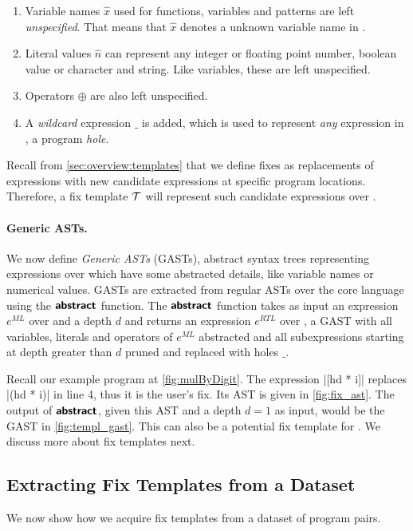 \begin{enumerate}
    \item Variable names $\hat{x}$ used for functions, variables and patterns
    are left \emph{unspecified}. That means that $\hat{x}$ denotes a unknown
    variable name in \repairLang.
    \item Literal values $\hat{n}$ can represent any integer or floating point
    number, boolean value or character and string. Like variables, these are
    left unspecified.
    \item Operators $\oplus$ are also left unspecified.
    \item A \emph{wildcard} expression $\_$ is added, which is used to represent
    \emph{any} expression in \repairLang, \ie a program \emph{hole}.
\end{enumerate}

Recall from \autoref{sec:overview:templates} that we define fixes as
replacements of expressions with new candidate expressions at specific program
locations. Therefore, a fix template $\mathcal{T}$ will represent such candidate
expressions over \repairLang.

\paragraph{Generic ASTs.}
We now define \emph{Generic ASTs} (GASTs), \ie abstract syntax trees
representing expressions over \repairLang which have some abstracted details,
like variable names or numerical values. GASTs are extracted from regular ASTs
over the core language \lang using the $\bm{\mathsf{abstract}}$ function. The $\bm{\mathsf{abstract}}$
function takes as input an expression $e^{ML}$ over \lang and a depth $d$ and
returns an expression $e^{RTL}$ over \repairLang, \ie a GAST with all variables,
literals and operators of $e^{ML}$ abstracted and all subexpressions starting at
depth greater than $d$ pruned and replaced with holes $\_$.


Recall our example program \mbd at \autoref{fig:mulByDigit}. The expression
|[hd * i]| replaces |(hd * i)| in line 4, thus it is the user's fix. Its AST
is given in \autoref{fig:fix_ast}. The output of $\bm{\mathsf{abstract}}$, given this AST and
a depth $d = 1$ as input, would be the GAST in \autoref{fig:templ_gast}. This
can also be a potential fix template for \mbd. We discuss more about fix
templates next.



\subsection{Extracting Fix Templates from a Dataset}
\label{sec:templ-cluster:templates}
We now show how we acquire fix templates from a dataset of program pairs.

